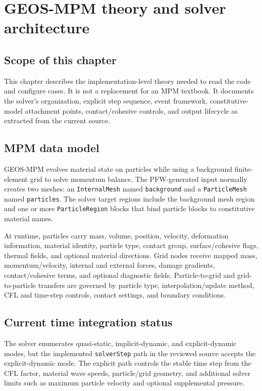 \chapter{GEOS-MPM theory and solver architecture}
\label{ch:theory}

\section{Scope of this chapter}
This chapter describes the implementation-level theory needed to read the code and configure cases.  It is not a replacement for an MPM textbook.  It documents the solver's organization, explicit step sequence, event framework, constitutive-model attachment points, contact/cohesive controls, and output lifecycle as extracted from the current source.

\section{MPM data model}
GEOS-MPM evolves material state on particles while using a background finite-element grid to solve momentum balance.  The PFW-generated input normally creates two meshes: an \texttt{InternalMesh} named \texttt{background} and a \texttt{ParticleMesh} named \texttt{particles}.  The solver target regions include the background mesh region and one or more \texttt{ParticleRegion} blocks that bind particle blocks to constitutive material names.

At runtime, particles carry mass, volume, position, velocity, deformation information, material identity, particle type, contact group, surface/cohesive flags, thermal fields, and optional material directions.  Grid nodes receive mapped mass, momentum/velocity, internal and external forces, damage gradients, contact/cohesive terms, and optional diagnostic fields.  Particle-to-grid and grid-to-particle transfers are governed by particle type, interpolation/update method, CFL and time-step controls, contact settings, and boundary conditions.

\section{Current time integration status}
The solver enumerates quasi-static, implicit-dynamic, and explicit-dynamic modes, but the implemented \texttt{solverStep} path in the reviewed source accepts the explicit-dynamic mode.  The explicit path controls the stable time step from the CFL factor, material wave speeds, particle/grid geometry, and additional solver limits such as maximum particle velocity and optional supplemental pressure.


